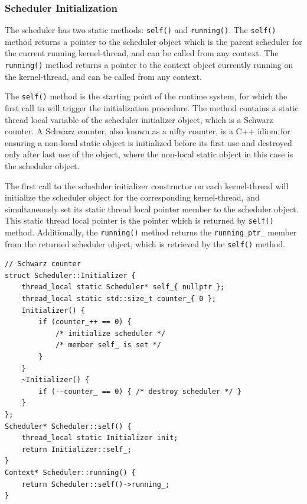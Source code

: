 \subsubsection{Scheduler Initialization}


The scheduler has two static methods: \lstinline[style={CustomC++}]|self()| and \lstinline[style={CustomC++}]|running()|. The \lstinline[style={CustomC++}]|self()| method returns a pointer to the scheduler object which is the parent scheduler for the current running kernel\hyp{}thread, and can be called from any context. The \lstinline[style={CustomC++}]|running()| method returns a pointer to the context object currently running on the kernel\hyp{}thread, and can be called from any context.

The \lstinline[style={CustomC++}]|self()| method is the starting point of the runtime system, for which the first call to will trigger the initialization procedure. The method contains a static thread local variable of the scheduler initializer object, which is a Schwarz counter. A Schwarz counter, also known as a nifty counter, is a C++ idiom for ensuring a non\hyp{}local static object is initialized before its first use and destroyed only after last use of the object, where the non\hyp{}local static object in this case is the scheduler object. 

The first call to the scheduler initializer constructor on each kernel\hyp{}thread will initialize the scheduler object for the corresponding kernel\hyp{}thread, and simultaneously set its static thread local pointer member to the scheduler object. This static thread local pointer is the pointer which is returned by \lstinline[style={CustomC++}]|self()| method. Additionally, the \lstinline[style={CustomC++}]|running()| method returns the \lstinline[style={CustomC++}]|running_ptr_| member from the returned scheduler object, which is retrieved by the \lstinline[style={CustomC++}]|self()| method.

\begin{lstfloat}
\begin{lstlisting}[caption={Static scheduler methods.}, label={lst:static_scheduler_methods}, style={CustomC++}, xleftmargin={2em}]
// Schwarz counter
struct Scheduler::Initializer {
    thread_local static Scheduler* self_{ nullptr };
    thread_local static std::size_t counter_{ 0 };
    Initializer() {
        if (counter_++ == 0) { 
            /* initialize scheduler */ 
            /* member self_ is set */
        }
    }
    ~Initializer() {
        if (--counter_ == 0) { /* destroy scheduler */ }
    }
};
Scheduler* Scheduler::self() {
    thread_local static Initializer init;
    return Initializer::self_;
}
Context* Scheduler::running() {
    return Scheduler::self()->running_;
}
\end{lstlisting}
\end{lstfloat}


